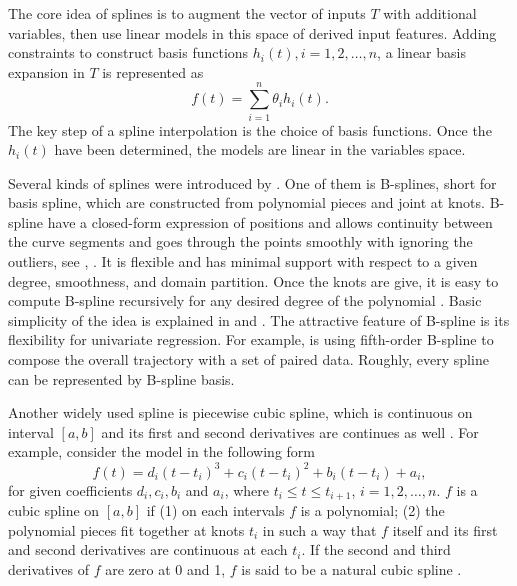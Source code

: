 The core idea of splines is to augment the vector of inputs $T$ with additional variables, then use linear models in this space of derived input features. Adding constraints to construct basis functions $h_i(t), i = 1, 2,\ldots, n$, a linear basis expansion in $T$ is represented as
\begin{equation*}
f(t)=\sum_{i=1}^n \theta_i h_i(t).
\end{equation*}
The key step of a spline interpolation is the choice of basis functions. Once the $h_i(t)$ have been determined, the models are linear in the variables space. 

Several kinds of splines were introduced by \cite{esl2009}. One of them is B-splines, short for basis spline, which are constructed from polynomial pieces and joint at knots. B-spline have a closed-form expression of positions and allows continuity between the curve segments and goes through the points smoothly with ignoring the outliers, see \eg \cite{komoriya1989trajectory}, \cite{ben2004geometric}. It is flexible and has minimal support with respect to a given degree, smoothness, and domain partition. Once the knots are give, it is easy to compute B-spline recursively for any desired degree of the polynomial \cite{de1978practical} \cite{cox1982practical}. Basic simplicity of the idea is explained in \cite{dierckx1995curve} and \cite{eilers1996flexible}. The attractive feature of B-spline is its flexibility for univariate regression. For example,  \cite{gasparetto2007new} is using fifth-order B-spline to compose the overall trajectory with a set of paired data. Roughly, every spline can be represented by B-spline basis. 

Another widely used spline is piecewise cubic spline, which is continuous on interval $[a,b]$ and its first and second derivatives are continues as well \cite{wolberg1988cubic}. For example, consider the model in the following form 
\begin{equation*}
f(t)=d_i(t-t_i)^3+c_i(t-t_i)^2+b_i(t-t_i)+a_i,
\end{equation*}
for given coefficients $d_i, c_i, b_i$ and $a_i$, where $t_i\leq t\leq t_{i+1}$, $i=1,2,\ldots,n$. $f$ is a cubic spline on $[a,b]$ if (1) on each intervals $f$ is a polynomial; (2) the polynomial pieces fit together at knots $t_i$ in such a way that $f$ itself and its first and second derivatives are continuous at each $t_i$. If the second and third derivatives of $f$ are zero at 0 and 1, $f$ is said to be a natural cubic spline \cite{green1993nonparametric}. 


